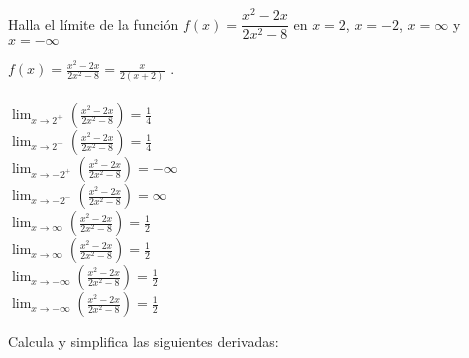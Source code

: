 \documentclass[addpoints,spanish, 12pt,a4paper]{exam}
\begin{document}
\begin{questions}

\question[2] Halla el límite de la función $f(x)=\dfrac{x^{2} - 2 x}{2 x^{2} - 8}$ en $x=2$, $x=-2$, $x=\infty$ y $x=-\infty$  


\begin{solution}
$f(x)=\frac{x^{2} - 2 x}{2 x^{2} - 8}=\frac{x}{2 \left(x + 2\right)}$ . \\  \\ $\lim_{x \to 2^+}\left(\frac{x^{2} - 2 x}{2 x^{2} - 8}\right)=\frac{1}{4}$ \\ $\lim_{x \to 2^-}\left(\frac{x^{2} - 2 x}{2 x^{2} - 8}\right)=\frac{1}{4}$ \\ $\lim_{x \to -2^+}\left(\frac{x^{2} - 2 x}{2 x^{2} - 8}\right)=-\infty$ \\ $\lim_{x \to -2^-}\left(\frac{x^{2} - 2 x}{2 x^{2} - 8}\right)=\infty$ \\ $\lim_{x \to \infty}\left(\frac{x^{2} - 2 x}{2 x^{2} - 8}\right)=\frac{1}{2}$ \\ $\lim_{x \to \infty}\left(\frac{x^{2} - 2 x}{2 x^{2} - 8}\right)=\frac{1}{2}$ \\ $\lim_{x \to -\infty}\left(\frac{x^{2} - 2 x}{2 x^{2} - 8}\right)=\frac{1}{2}$ \\ $\lim_{x \to -\infty}\left(\frac{x^{2} - 2 x}{2 x^{2} - 8}\right)=\frac{1}{2}$

\end{solution}


\addpoints

\question Calcula y simplifica las siguientes derivadas: 




\end{questions}
\end{document}
